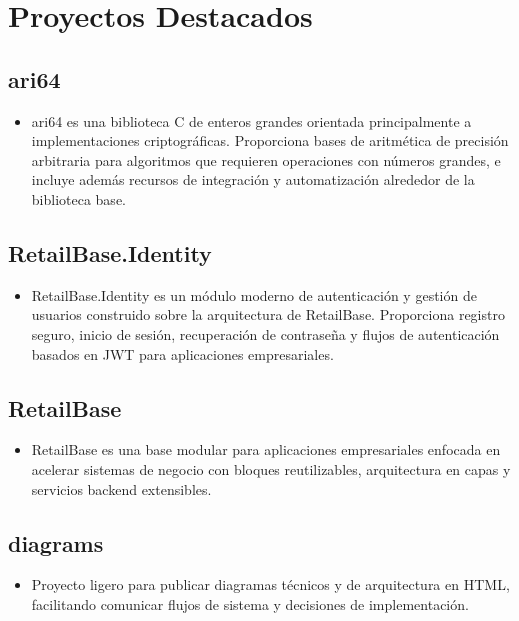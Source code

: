 \section*{Proyectos Destacados}
\subsection*{ari64}
\begin{itemize}[leftmargin=12pt]
    \item ari64 es una biblioteca C de enteros grandes orientada principalmente a implementaciones criptográficas. Proporciona bases de aritmética de precisión arbitraria para algoritmos que requieren operaciones con números grandes, e incluye además recursos de integración y automatización alrededor de la biblioteca base.
\end{itemize}

\subsection*{RetailBase.Identity}
\begin{itemize}[leftmargin=12pt]
    \item RetailBase.Identity es un módulo moderno de autenticación y gestión de usuarios construido sobre la arquitectura de RetailBase. Proporciona registro seguro, inicio de sesión, recuperación de contraseña y flujos de autenticación basados en JWT para aplicaciones empresariales.
\end{itemize}

\subsection*{RetailBase}
\begin{itemize}[leftmargin=12pt]
    \item RetailBase es una base modular para aplicaciones empresariales enfocada en acelerar sistemas de negocio con bloques reutilizables, arquitectura en capas y servicios backend extensibles.
\end{itemize}

\subsection*{diagrams}
\begin{itemize}[leftmargin=12pt]
    \item Proyecto ligero para publicar diagramas técnicos y de arquitectura en HTML, facilitando comunicar flujos de sistema y decisiones de implementación.
\end{itemize}

